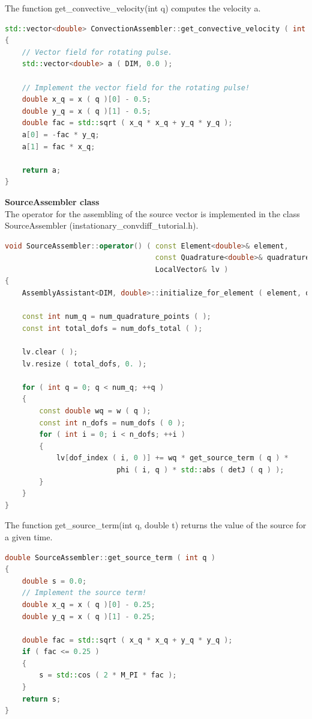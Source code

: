 \documentclass[a4paper, 11pt, twoside]{article}
\begin{document}
The function get\_convective\_velocity(int q) computes the velocity a.
\begin{lstlisting}[language=C++, basicstyle={\footnotesize, \ttfamily}, keywordstyle=\color{blue}, numbers=none, tabsize=4]
std::vector<double> ConvectionAssembler::get_convective_velocity ( int q )
{
    // Vector field for rotating pulse.
    std::vector<double> a ( DIM, 0.0 );

    // Implement the vector field for the rotating pulse!
    double x_q = x ( q )[0] - 0.5;
    double y_q = x ( q )[1] - 0.5;
    double fac = std::sqrt ( x_q * x_q + y_q * y_q );
    a[0] = -fac * y_q;
    a[1] = fac * x_q;

    return a;
}
\end{lstlisting}

\textbf{SourceAssembler class}\\
The operator for the assembling of the source vector is implemented in the class SourceAssembler (instationary\_convdiff\_tutorial.h).
\begin{lstlisting}[language=C++, basicstyle={\footnotesize, \ttfamily}, keywordstyle=\color{blue}, numbers=none, tabsize=4]
void SourceAssembler::operator() ( const Element<double>& element, 
                                   const Quadrature<double>& quadrature, 
                                   LocalVector& lv )
{
    AssemblyAssistant<DIM, double>::initialize_for_element ( element, quadrature );

    const int num_q = num_quadrature_points ( );
    const int total_dofs = num_dofs_total ( );

    lv.clear ( );
    lv.resize ( total_dofs, 0. );

    for ( int q = 0; q < num_q; ++q )
    {
        const double wq = w ( q );
        const int n_dofs = num_dofs ( 0 );
        for ( int i = 0; i < n_dofs; ++i )
        {
            lv[dof_index ( i, 0 )] += wq * get_source_term ( q ) * 
                          phi ( i, q ) * std::abs ( detJ ( q ) );
        }
    }
}
\end{lstlisting}

The function get\_source\_term(int q, double t) returns the value of the source for a given time.
\begin{lstlisting}[language=C++, basicstyle={\footnotesize, \ttfamily}, keywordstyle=\color{blue}, numbers=none, tabsize=4]
double SourceAssembler::get_source_term ( int q )
{
    double s = 0.0;
    // Implement the source term!
    double x_q = x ( q )[0] - 0.25;
    double y_q = x ( q )[1] - 0.25;

    double fac = std::sqrt ( x_q * x_q + y_q * y_q );
    if ( fac <= 0.25 )
    {
        s = std::cos ( 2 * M_PI * fac );
    }
    return s;
}
\end{lstlisting}
\end{document}
